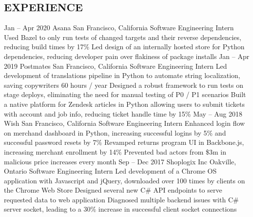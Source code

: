 \documentclass{aanguyen_res}
\begin{document}
  \begin{main}
    \vspace{0.2cm}%
    \section{EXPERIENCE}
      \begin{entrylist}
        \rightentry%
          {Jan -- Apr 2020}%
          {Asana}%
          {San Francisco, California}%
          {Software Engineering Intern}%
          {\createlist%
            {%
              Used Bazel to only run tests of changed targets and their reverse dependencies, %
              reducing build times by 17\% %
            }%
            {%
              Led design of an internally hosted store for Python dependencies, reducing developer %
              pain over flakiness of package installs %
            }%
          }
        \rightentry%
          {Jan -- Apr 2019}%
          {Postmates}%
          {San Francisco, California}%
          {Software Engineering Intern}%
          {\createlist%
            {%
              Led development of translations pipeline in Python to automate string localization, %
              saving copywriters 60 hours / year %
            }%
            {%
              Designed a robust framework to run tests on stage deploys, eliminating the need for %
              manual testing of P0 / P1 scenarios %
            }%
            {%
              Built a native platform for Zendesk articles in Python allowing users to submit tickets %
              with account and job info, reducing ticket handle time by 15\% %
            }%
          }
        \rightentry%
          {May -- Aug 2018}%
          {Wish}%
          {San Francisco, California}%
          {Software Engineering Intern}%
          {\createlist%
            {%
              Enhanced login flow on merchand dashboard in Python, increasing successful logins %
              by 5\% and successful password resets by 7\% %
            }%
            {%
              Revamped returns program UI in Backbone.js, increasing merchant enrollment %
              by 14\% %
            }%
            {%
              Prevented bad actors from \$3m in malicious price increases every month %
            }%
          }
        \rightentry%
          {Sep -- Dec 2017}%
          {Shoplogix Inc}%
          {Oakville, Ontario}%
          {Software Engineering Intern}%
          {\createlist%
            {%
              Led development of a Chrome OS application with Javascript and jQuery, downloaded %
              over 100 times by clients on the Chrome Web Store %
            }%
            {%
              Designed several new C\# API endpoints to serve requested data to web application %
            }%
            {%
              Diagnosed multiple backend issues with C\# server socket, leading to a 30\% increase %
              in successful client socket connections %
            }%
          }
      \end{entrylist}

\end{main}
\end{document}
